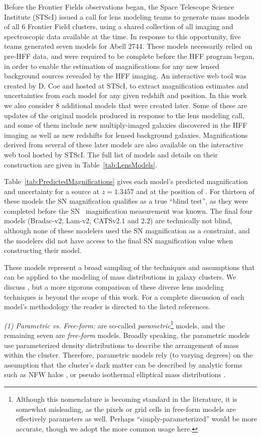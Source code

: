 Before the Frontier Fields observations began, the Space Telescope
Science Institute (STScI) issued a call for lens modeling teams to
generate mass models of all 6 Frontier Field clusters, using a shared
collection of all imaging and spectroscopic data available at the
time.  In response to this opportunity, five teams generated seven
models for Abell 2744.  These models necessarily relied on
pre-HFF data, and were required to be complete before the HFF program
began, in order to enable the estimation of magnifications for any new
lensed background sources revealed by the HFF imaging. An interactive
web tool was created by D. Coe and hosted at STScI, to extract
magnification estimates and uncertainties from each model for any
given redshift and position.  In this work we also consider 8
additional models that were created later.  Some of these are
updates of the original models produced in response to the lens
modeling call,  and some of them include new
multiply-imaged galaxies discovered in the HFF imaging as well as new
redshifts for lensed background galaxies.  Magnifications derived from
several of these later models are also available on the interactive
web tool hosted by STScI.  The full list of models and details on
their construction are given in Table~\ref{tab:LensModels}.



Table~\ref{tab:PredictedMagnifications} gives each model's predicted
magnification and uncertainty for a source at $z=1.3457$ and at the
position of \tomas.  
For thirteen of these models the SN magnification qualifies as a true
``blind test'', as they were completed before the SN \tomas\
magnification measurement was known.  The final four models
(Bradac-v2, Lam-v2, CATSv2.1 and 2.2) are technically not blind,
although none of these modelers used the SN magnification as a
constraint, and the modelers did not have access to the final SN
magnification value when constructing their model.

These models represent a broad sampling of the
techniques and assumptions that can be applied to the modeling of mass
distributions in galaxy clusters. 
We discuss , but
a more rigorous comparison of these diverse lens modeling techniques
is beyond the scope of this work. For a complete discussion of each
model's methodology the reader is directed to the listed references.

\smallskip
{\it (1) Parametric vs. Free-form:}
 are so-called {\it parametric}\footnote{Although this
nomenclature is becoming standard in the literature, it is somewhat
misleading, as the pixels or grid cells in free-form models are
effectively parameters as well. Perhaps ``simply-parameterized'' would
be more accurate, though we adopt the more common usage here.}
models, and the remaining seven are {\it free-form} models.  
Broadly speaking, the parametric models use parameterized density
distributions to describe the arrangement of mass within the cluster.
Therefore, parametric models rely (to
varying degrees) on the assumption that the cluster's dark matter can
be described by analytic forms such as NFW halos \citep{Navarro:1997},
or pseudo isothermal elliptical mass
distributions \citep[PIEMD][]{Kassiola:1993}.

